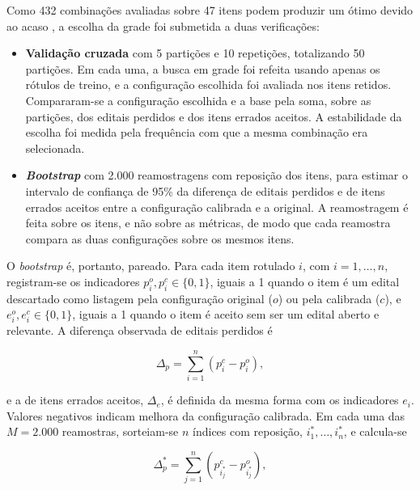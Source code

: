 Como 432 combinações avaliadas sobre 47 itens podem produzir um ótimo devido ao
acaso \cite{cawley2010}, a escolha da grade foi submetida a duas verificações:

\begin{itemize}
  \item \textbf{Validação cruzada} \cite{kohavi1995} com 5 partições e 10
    repetições, totalizando 50 partições. Em cada uma, a busca em grade foi
    refeita usando apenas os rótulos de treino, e a configuração escolhida foi
    avaliada nos itens retidos. Compararam-se a configuração escolhida e a base
    pela soma, sobre as partições, dos editais perdidos e dos itens errados
    aceitos. A estabilidade da escolha foi medida pela frequência com que a
    mesma combinação era selecionada.
  \item \textbf{\textit{Bootstrap}} \cite{efron1993} com 2.000 reamostragens com
    reposição dos itens, para estimar o intervalo de confiança de 95\% da
    diferença de editais perdidos e de itens errados aceitos entre a
    configuração calibrada e a original. A reamostragem é feita sobre os itens,
    e não sobre as métricas, de modo que cada reamostra compara as duas
    configurações sobre os mesmos itens.
\end{itemize}

O \textit{bootstrap} é, portanto, pareado. Para cada item rotulado $i$, com
$i = 1, \dots, n$, registram-se os indicadores $p_i^{o}, p_i^{c} \in \{0, 1\}$,
iguais a 1 quando o item é um edital descartado como listagem pela
configuração original ($o$) ou pela calibrada ($c$), e
$e_i^{o}, e_i^{c} \in \{0, 1\}$, iguais a 1 quando o item é aceito sem ser um
edital aberto e relevante. A diferença observada de editais perdidos é

\begin{equation}
\Delta_p = \sum_{i=1}^{n} \left( p_i^{c} - p_i^{o} \right),
\label{eq:bootstrap}
\end{equation}

\noindent e a de itens errados aceitos, $\Delta_e$, é definida da mesma forma
com os indicadores $e_i$. Valores negativos indicam melhora da configuração
calibrada. Em cada uma das $M = 2.000$ reamostras, sorteiam-se $n$ índices com
reposição, $i_1^{*}, \dots, i_n^{*}$, e calcula-se

\begin{equation}
\Delta_p^{*} = \sum_{j=1}^{n} \left( p_{i_j^{*}}^{c} - p_{i_j^{*}}^{o} \right),
\label{eq:bootstrap_reamostra}
\end{equation}

